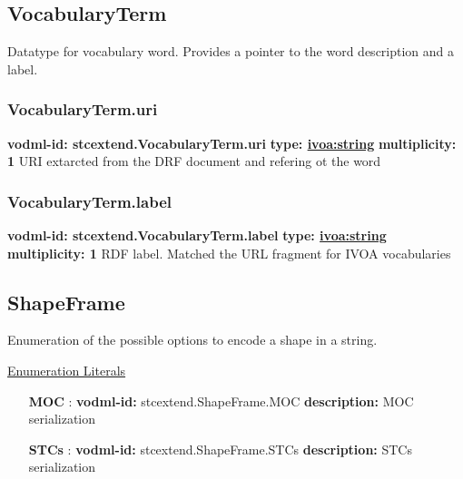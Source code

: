   \subsection{VocabularyTerm}
  \label{sect:stcextend.VocabularyTerm}
    Datatype for vocabulary word. Provides a pointer to the word description and a label.

    \subsubsection{VocabularyTerm.uri}
      \textbf{vodml-id: stcextend.VocabularyTerm.uri} \newline
      \textbf{type: \hyperref[sect:ivoa]{ivoa:string}} \newline
      \textbf{multiplicity: 1} \newline 
      URI extarcted from the DRF document and refering ot the word

    \subsubsection{VocabularyTerm.label}
      \textbf{vodml-id: stcextend.VocabularyTerm.label} \newline
      \textbf{type: \hyperref[sect:ivoa]{ivoa:string}} \newline
      \textbf{multiplicity: 1} \newline 
      RDF label. Matched the URL fragment for IVOA vocabularies

  \subsection{ShapeFrame}
  \label{sect:stcextend.ShapeFrame}

  Enumeration of the possible options to encode a shape in a string.

  \noindent \underline{Enumeration Literals}
  \vspace{-\parsep}
  \small
  \begin{itemize}
  
    \item[\textbf{MOC}]: \textbf{vodml-id:} stcextend.ShapeFrame.MOC \newline
          \textbf{description:} MOC serialization
    \item[\textbf{STCs}]: \textbf{vodml-id:} stcextend.ShapeFrame.STCs \newline
          \textbf{description:} STCs serialization
  \end{itemize}
  \normalsize

